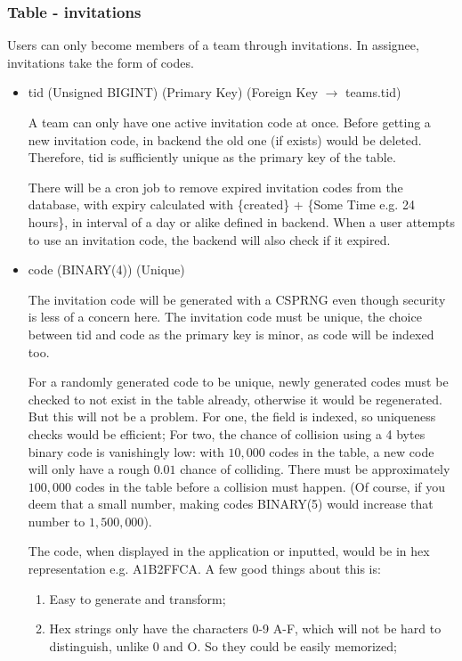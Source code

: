 \documentclass[12pt]{report}
\newcommand{\n}{\par}
\begin{document}
\subsubsection{Table - invitations} \label{data-layer.design.team-system.invitations}
Users can only become members of a team through invitations.
In assignee, invitations take the form of codes.
\begin{itemize}
	\item tid (Unsigned BIGINT) (Primary Key) (Foreign Key $\rightarrow$ teams.tid)\n
	      A team can only have one active invitation code at once.
	      Before getting a new invitation code, in backend the old one (if exists) would be deleted.
	      Therefore, tid is sufficiently unique as the primary key of the table.\n
	      There will be a cron job to remove expired invitation codes from the database,
	      with expiry calculated with \{created\} + \{Some Time e.g. 24 hours\},
	      in interval of a day or alike defined in backend.
	      When a user attempts to use an invitation code, the backend will also check if it expired.
	\item code (BINARY(4)) (Unique)\n
	      The invitation code will be generated with a CSPRNG even though security is less of a concern here.
	      The invitation code must be unique, the choice between tid and code as the primary key is minor,
	      as code will be indexed too.\n
	      For a randomly generated code to be unique, newly generated codes must be checked to not exist in the table already,
	      otherwise it would be regenerated. But this will not be a problem.
	      For one, the field is indexed, so uniqueness checks would be efficient;
	      For two, the chance of collision using a 4 bytes binary code is vanishingly low:
	      with $10,000$ codes in the table, a new code will only have a rough $0.01$ chance of colliding.
	      There must be approximately $100,000$ codes in the table before a collision must happen.
	      (Of course, if you deem that a small number,
	      making codes BINARY(5) would increase that number to $1,500,000$).\n
	      The code, when displayed in the application or inputted,
	      would be in hex representation e.g. A1B2FFCA.
	      A few good things about this is:
	      \begin{enumerate}
		      \item Easy to generate and transform;
		      \item Hex strings only have the characters 0-9 A-F, which will not be hard to distinguish, unlike 0 and O.
		            So they could be easily memorized;
	      \end{enumerate}
\end{itemize}
\end{document}
